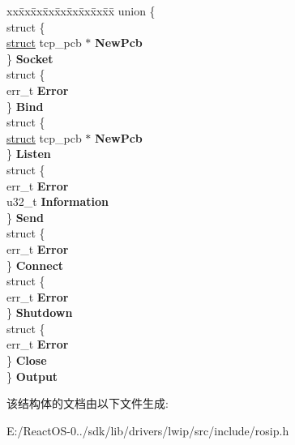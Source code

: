 \begin{DoxyCompactItemize}
\begin{tabbing}
\end{tabbing}\item 
\mbox{\label{structlwip__callback__msg_ae13b6bb8551dfcc09ca40ed0db4edec2}} 
\begin{tabbing}
xx\=xx\=xx\=xx\=xx\=xx\=xx\=xx\=xx\=\kill
union \{\\
\>struct \{\\
\>\>\hyperlink{interfacestruct}{struct} tcp\_pcb $\ast$ {\bfseries NewPcb}\\
\>\} {\bfseries Socket}\\
\>struct \{\\
\>\>err\_t {\bfseries Error}\\
\>\} {\bfseries Bind}\\
\>struct \{\\
\>\>\hyperlink{interfacestruct}{struct} tcp\_pcb $\ast$ {\bfseries NewPcb}\\
\>\} {\bfseries Listen}\\
\>struct \{\\
\>\>err\_t {\bfseries Error}\\
\>\>u32\_t {\bfseries Information}\\
\>\} {\bfseries Send}\\
\>struct \{\\
\>\>err\_t {\bfseries Error}\\
\>\} {\bfseries Connect}\\
\>struct \{\\
\>\>err\_t {\bfseries Error}\\
\>\} {\bfseries Shutdown}\\
\>struct \{\\
\>\>err\_t {\bfseries Error}\\
\>\} {\bfseries Close}\\
\} {\bfseries Output}\\

\end{tabbing}\end{DoxyCompactItemize}


该结构体的文档由以下文件生成\+:\begin{DoxyCompactItemize}
\item 
E\+:/\+React\+O\+S-\/0../sdk/lib/drivers/lwip/src/include/rosip.\+h\end{DoxyCompactItemize}
